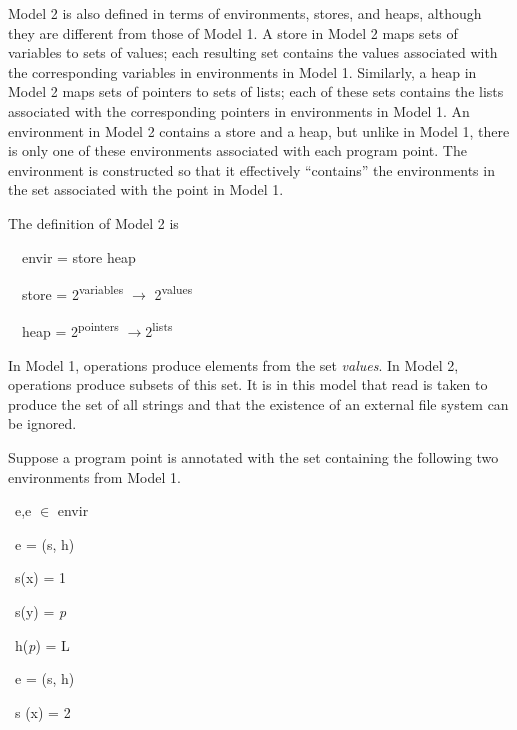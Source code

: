 Model 2 is also defined in terms of environments, stores, and heaps,
although they are different from those of Model 1.  A store in Model 2
maps sets of variables to sets of values; each resulting set contains
the values associated with the corresponding variables in environments
in Model 1. Similarly, a heap in Model 2 maps sets of pointers to sets
of lists; each of these sets contains the lists associated with the
corresponding pointers in environments in Model 1. An environment in
Model 2 contains a store and a heap, but unlike in Model 1, there is
only one of these environments associated with each program point. The
environment is constructed so that it effectively ``contains'' the
environments in the set associated with the point in Model 1.

The definition of Model 2 is 

{\ttfamily\mdseries
\ \ envir\TextSubscript{[2]} = store\TextSubscript{[2]} {\texttimes} heap\TextSubscript{[2]}}

{\ttfamily\mdseries
\ \ store\TextSubscript{[2]} = 2\textsuperscript{variables} \textrm{${\rightarrow}$} 2\textsuperscript{values}}

{\ttfamily\mdseries
\ \ heap\TextSubscript{[2]} = 2\textsuperscript{pointers} $\rightarrow $2\textsuperscript{lists}}


In Model 1, operations produce elements from the set
\textit{values}. In Model 2, operations produce subsets of this
set. It is in this model that read is taken to produce the set of all
strings and that the existence of an external file system can be
ignored.

Suppose a program point is annotated with the set containing the
following two environments from Model 1.

{\ttfamily\mdseries
\ e,e ${\in}$ envir\TextSubscript{[1]}}

{\ttfamily\mdseries
\ e = (s, h)}

{\ttfamily\mdseries
\ s(x) = 1}

{\ttfamily\mdseries
\ s(y) = \textit{p}\textit{}}

{\ttfamily\mdseries
\ h(\textit{p}\textit{}) = L}

{\ttfamily\mdseries
\ e = (s, h)}

{\ttfamily\mdseries
\ s (x) = 2}


